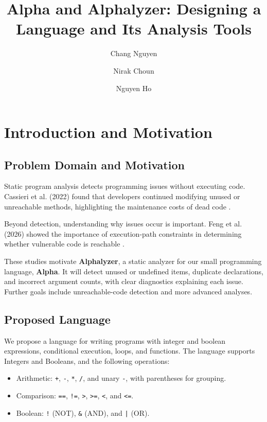 \documentclass{article}
\begin{document}
\title{\vspace{-0.7874in}Alpha and Alphalyzer: Designing a Language and Its Analysis Tools}
\author{Chang Nguyen \and Nirak Choun \and Nguyen Ho}
\date{}

\maketitle

\section{Introduction and Motivation}

\subsection{Problem Domain and Motivation}

Static program analysis detects programming issues without executing code.
Cassieri et al. (2022) found that developers continued modifying unused or
unreachable methods, highlighting the maintenance costs of dead code
\cite{paper1}.

Beyond detection, understanding why issues occur is important. Feng et al.
(2026) showed the importance of execution-path constraints in determining
whether vulnerable code is reachable \cite{source3}.

These studies motivate \textbf{Alphalyzer}, a static analyzer for our small
programming language, \textbf{Alpha}. It will detect unused or undefined
items, duplicate declarations, and incorrect argument counts, with clear
diagnostics explaining each issue. Further goals include unreachable-code
detection and more advanced analyses.

\subsection{Proposed Language}
\label{sec:proposed-language}
We propose a language for writing programs with integer and boolean expressions,
conditional execution, loops, and functions. The language supports Integers and
Booleans, and the following operations:

\begin{itemize}
    \setlength{\itemsep}{0pt}
    \item Arithmetic: \texttt{+}, \texttt{-}, \texttt{*}, \texttt{/},
    and unary \texttt{-}, with parentheses for grouping.
    \item Comparison: \texttt{==}, \texttt{!=}, \texttt{>}, \texttt{>=},
    \texttt{<}, and \texttt{<=}.
    \item Boolean: \texttt{!} (NOT), \texttt{\&} (AND), and \texttt{|} (OR).
\end{itemize}
\end{document}
